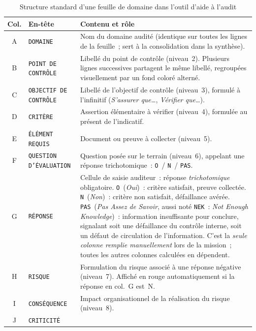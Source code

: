 \begin{table}[H]
\centering
\small
\caption{Structure standard d'une feuille de domaine dans l'outil d'aide à
l'audit}
\label{tab:colonnes-excel}
\begin{tabular}{clp{7.5cm}}
\toprule
\textbf{Col.} & \textbf{En-tête} & \textbf{Contenu et rôle} \\
\midrule
A & \texttt{DOMAINE} &
  Nom du domaine audité (identique sur toutes les lignes de la feuille~;
  sert à la consolidation dans la synthèse). \\
\addlinespace
B & \texttt{POINT DE CONTRÔLE} &
  Libellé du point de contrôle (niveau~2). Plusieurs lignes successives
  partagent le même libellé, regroupées visuellement par un fond coloré
  alterné. \\
\addlinespace
C & \texttt{OBJECTIF DE CONTRÔLE} &
  Libellé de l'objectif de contrôle (niveau~3), formulé à l'infinitif
  (\emph{S'assurer que\ldots}, \emph{Vérifier que\ldots}). \\
\addlinespace
D & \texttt{CRITÈRE} &
  Assertion élémentaire à vérifier (niveau~4), formulée au présent de
  l'indicatif. \\
\addlinespace
E & \texttt{ÉLÉMENT REQUIS} &
  Document ou preuve à collecter (niveau~5). \\
\addlinespace
F & \texttt{QUESTION D'ÉVALUATION} &
  Question posée sur le terrain (niveau~6), appelant une réponse
  trichotomique~: \texttt{O}~/ \texttt{N}~/ \texttt{PAS}. \\
\addlinespace
G & \texttt{RÉPONSE} &
  Cellule de saisie auditeur~: réponse \emph{trichotomique} obligatoire.
  \texttt{O}~(\emph{Oui})~: critère satisfait, preuve collectée.
  \texttt{N}~(\emph{Non})~: critère non satisfait, défaillance avérée.
  \texttt{PAS}~(\emph{Pas Assez de Savoir}, aussi noté \texttt{NEK}~: 
  \emph{Not Enough Knowledge})~: information insuffisante pour conclure,
  signalant soit une défaillance du contrôle interne, soit un défaut de
  circulation de l'information.
  C'est la \emph{seule colonne remplie manuellement} lors de la mission~;
  toutes les autres colonnes calculées en dépendent. \\
\addlinespace
H & \texttt{RISQUE} &
  Formulation du risque associé à une réponse négative (niveau~7).
  Affiché en rouge automatiquement si la réponse en col.~G est~N. \\
\addlinespace
I & \texttt{CONSÉQUENCE} &
  Impact organisationnel de la réalisation du risque (niveau~8). \\
\addlinespace
J & \texttt{CRITICITÉ} &

\end{tabular}
\end{table}
